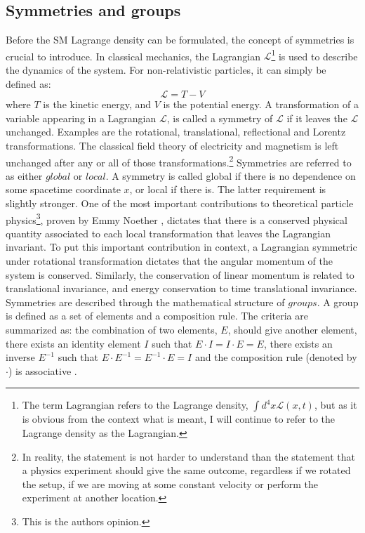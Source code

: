 \subsection*{Symmetries and groups}\label{sec:symmetries}
\noindent\justify
Before the SM Lagrange density can be formulated, the concept of symmetries is crucial to introduce. 
In classical mechanics, the Lagrangian $\mathcal{L}$\footnote{The term Lagrangian refers to the Lagrange density, $\int d^{4}x\mathcal{L}(x,t)$, but as it is obvious from the context what is meant, I will continue to refer to the Lagrange density as the Lagrangian. } is used to describe the dynamics of the system. 
For non-relativistic particles, it can simply be defined as:
\begin{equation}
\mathcal{L}=T-V
\end{equation}
where $T$ is the kinetic energy, and $V$ is the potential energy. 
A transformation of a variable appearing in a Lagrangian $\mathcal{L}$, is called a symmetry of $\mathcal{L}$ if it leaves the $\mathcal{L}$ unchanged. 
Examples are the rotational, translational, reflectional and Lorentz transformations. 
The classical field theory of electricity and magnetism is left unchanged after any or all of those transformations.\footnote{In reality, the statement is not harder to understand than the statement that a physics experiment should give the same outcome, regardless if we rotated the setup, if we are moving at some constant velocity or perform the experiment at another location.} 
Symmetries are referred to as either $global$ or $local$.
A symmetry is called global if there is no dependence on some spacetime coordinate $x$, or local if there is. The latter requirement is slightly stronger.  
\newpara
\noindent\justify
One of the most important contributions to theoretical particle physics\footnote{This is the authors opinion.}, proven by Emmy Noether \cite{Noether1918}, dictates that there is a conserved physical quantity associated to each local transformation that leaves the Lagrangian invariant.   
To put this important contribution in context, a Lagrangian symmetric under rotational transformation dictates that the angular momentum of the system is conserved.
Similarly, the conservation of linear momentum is related to translational invariance, and energy conservation to time translational invariance.  
Symmetries are described through the mathematical structure of $groups$. 
A group is defined as a set of elements and a composition rule. 
The criteria are summarized as: the combination of two elements, $E$, should give another element, there exists an identity element $I$ such that $E\cdot I=I\cdot E=E$, there exists an inverse $E^{-1}$ such that $E\cdot E^{-1}=E^{-1}\cdot E=I$ and the composition rule (denoted by $\cdot$) is associative \cite{Kane:2244793}.   

